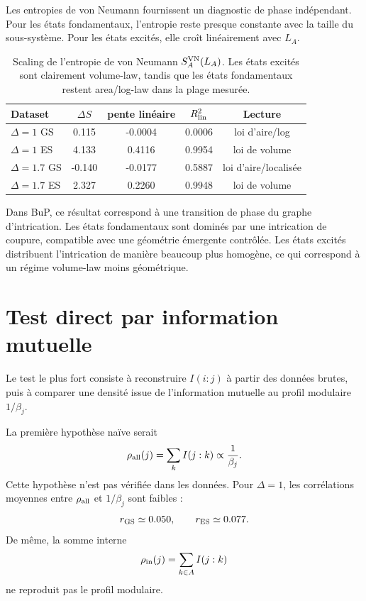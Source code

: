 \documentclass[11pt,a4paper]{article}
\begin{document}
Les entropies de von Neumann fournissent un diagnostic de phase indépendant. Pour les états fondamentaux, l'entropie reste presque constante avec la taille du sous-système. Pour les états excités, elle croît linéairement avec $L_A$.

\begin{table}[h]
\centering
\begin{tabular}{lcccc}
\toprule
Dataset & $\Delta S$ & pente linéaire & $R^2_{\rm lin}$ & Lecture \\
\midrule
$\Delta=1$ GS & 0.115 & -0.0004 & 0.0006 & loi d'aire/log \\
$\Delta=1$ ES & 4.133 & 0.4116 & 0.9954 & loi de volume \\
$\Delta=1.7$ GS & -0.140 & -0.0177 & 0.5887 & loi d'aire/localisée \\
$\Delta=1.7$ ES & 2.327 & 0.2260 & 0.9948 & loi de volume \\
\bottomrule
\end{tabular}
\caption{Scaling de l'entropie de von Neumann $S_A^{\rm VN}(L_A)$. Les états excités sont clairement volume-law, tandis que les états fondamentaux restent area/log-law dans la plage mesurée.}
\label{tab:entropy_scaling}
\end{table}

Dans BuP, ce résultat correspond à une transition de phase du graphe d'intrication. Les états fondamentaux sont dominés par une intrication de coupure, compatible avec une géométrie émergente contrôlée. Les états excités distribuent l'intrication de manière beaucoup plus homogène, ce qui correspond à un régime volume-law moins géométrique.

\section{Test direct par information mutuelle}

Le test le plus fort consiste à reconstruire $I(i:j)$ à partir des données brutes, puis à comparer une densité issue de l'information mutuelle au profil modulaire $1/\beta_j$.

La première hypothèse naïve serait
\[
\rho_{\rm all}(j)=\sum_k I(j:k)
\propto
\frac{1}{\beta_j}.
\]
Cette hypothèse n'est pas vérifiée dans les données. Pour $\Delta=1$, les corrélations moyennes entre $\rho_{\rm all}$ et $1/\beta_j$ sont faibles :
\[
r_{\rm GS}\simeq0.050,
\qquad
r_{\rm ES}\simeq0.077.
\]
De même, la somme interne
\[
\rho_{\rm in}(j)=\sum_{k\in A}I(j:k)
\]
ne reproduit pas le profil modulaire.
\end{document}
